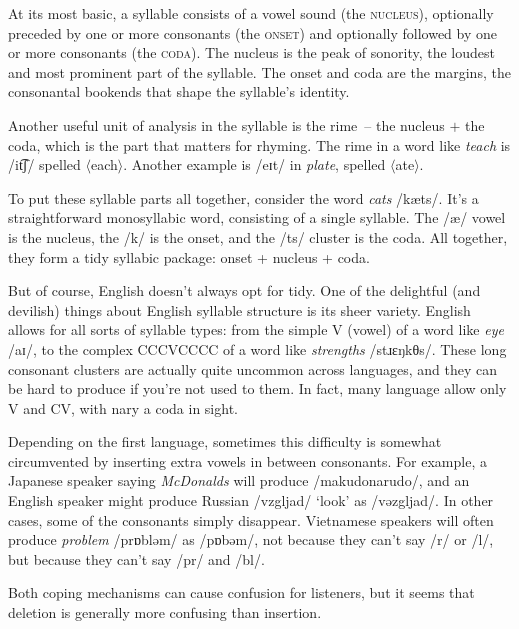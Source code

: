 At its most basic, a syllable consists of a vowel sound (the \textsc{nucleus}), optionally preceded by one or more consonants (the \textsc{onset}) and optionally followed by one or more consonants (the \textsc{coda}). The nucleus is the peak of sonority, the loudest and most prominent part of the syllable. The onset and coda are the margins, the consonantal bookends that shape the syllable's identity.

Another useful unit of analysis in the syllable is the rime~-- the nucleus $+$ the coda, which is the part that matters for rhyming. The rime in a word like \textit{teach} is /it͡ʃ/ spelled $\langle$each$\rangle$. Another example is /eɪt/ in \textit{plate}, spelled $\langle$ate$\rangle$.

To put these syllable parts all together, consider the word \textit{cats} /kæts/. It's a straightforward monosyllabic word, consisting of a single syllable. The /æ/ vowel is the nucleus, the /k/ is the onset, and the /ts/ cluster is the coda. All together, they form a tidy syllabic package: onset + nucleus + coda.

But of course, English doesn't always opt for tidy. One of the delightful (and devilish) things about English syllable structure is its sheer variety. English allows for all sorts of syllable types: from the simple V (vowel) of a word like \textit{eye} /aɪ/, to the complex CCCVCCCC of a word like \textit{strengths} /stɹɛŋkθs/. These long consonant clusters are actually quite uncommon across languages, and they can be hard to produce if you're not used to them. In fact, many language allow only V and CV, with nary a coda in sight.

Depending on the first language, sometimes this difficulty is somewhat circumvented by inserting extra vowels in between consonants. For example, a Japanese speaker saying \textit{McDonalds} will produce /makudonarudo/, and an English speaker might produce Russian /vzgljad/ `look' as /vəzgljad/. In other cases, some of the consonants simply disappear. Vietnamese speakers will often produce \textit{problem} /prɒbləm/ as /pɒbəm/, not because they can't say /r/ or /l/, but because they can't say /pr/ and /bl/.

Both coping mechanisms can cause confusion for listeners, but it seems that deletion is generally more confusing than insertion.

